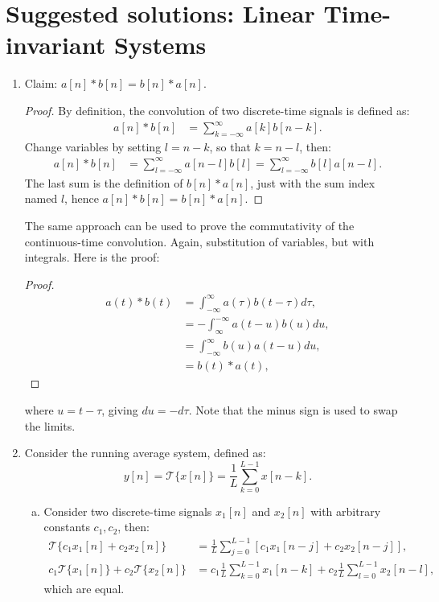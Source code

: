 \newpage
\section{Suggested solutions: Linear Time-invariant Systems}
\begin{enumerate}

\item Claim: $a[n]*b[n]=b[n]*a[n]$.
\begin{proof}
By definition, the convolution of two discrete-time signals is defined as:
\begin{align*}
    a[n]*b[n]&=\sum_{k=-\infty}^{\infty} a[k]b[n-k].
\end{align*}
Change variables by setting $l=n-k$, so that $k=n-l$, then:
\begin{align*}
    a[n]*b[n]&=\sum_{l=-\infty}^{\infty}a[n-l]b[l]=\sum_{l=-\infty}^{\infty}b[l]a[n-l].
\end{align*}
The last sum is the definition of $b[n]*a[n]$, just with the sum index named $l$, hence $a[n]*b[n]=b[n]*a[n]$. 
\end{proof}
The same approach can be used to prove the commutativity of the continuous-time convolution. Again, substitution of variables, but with integrals. Here is the proof:
\begin{proof}
\begin{align*}
    a(t)*b(t) &= \int_{-\infty}^{\infty}a(\tau)b(t-\tau)d\tau, \\
              &= -\int_{\infty}^{-\infty}a(t-u)b(u)du, \\
              &= \int_{-\infty}^{\infty}b(u)a(t-u)du, \\
              &= b(t) * a(t),
\end{align*}
\end{proof}
where $u=t-\tau$, giving $du=-d\tau$. Note that the minus sign is used to swap the limits. 

\item Consider the running average system, defined as:
$$y[n]=\mathcal{T}\{x[n]\}=\frac{1}{L}\sum_{k=0}^{L-1}x[n-k].$$

\begin{enumerate}[a)]
\item Consider two discrete-time signals $x_{1}[n]$ and $x_{2}[n]$ with arbitrary constants $c_{1},c_{2}$, then:
\begin{align*}
    \mathcal{T}\{c_{1}x_{1}[n]+c_{2}x_{2}[n]\}&=\frac{1}{L}\sum_{j=0}^{L-1}[c_{1}x_{1}[n-j]+c_{2}x_{2}[n-j]], \\
    c_{1}\mathcal{T}\{x_{1}[n]\}+c_{2}\mathcal{T}\{x_{2}[n]\}&=c_{1}\frac{1}{L}\sum_{k=0}^{L-1}x_{1}[n-k]+c_{2}\frac{1}{L}\sum_{l=0}^{L-1}x_{2}[n-l],
\end{align*}
which are equal. 


\end{enumerate}
\end{enumerate}
